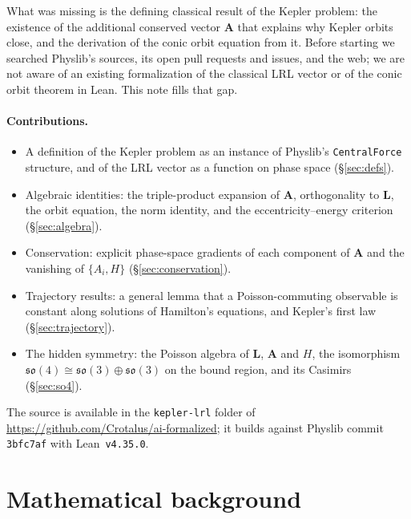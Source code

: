 \documentclass[11pt]{article}
\theoremstyle{definition}
\theoremstyle{remark}
\newcommand{\vA}{\mathbf{A}}
\newcommand{\vL}{\mathbf{L}}
\begin{document}
What was missing is the defining classical result of the Kepler problem: the existence of the
additional conserved vector $\vA$ that explains why Kepler orbits close, and the derivation of
the conic orbit equation from it. Before starting we searched Physlib's sources, its open
pull requests and issues, and the web; we are not aware of an existing formalization of the
classical LRL vector or of the conic orbit theorem in Lean. This note fills that gap.

\paragraph{Contributions.}
\begin{itemize}
  \item A definition of the Kepler problem as an instance of Physlib's \texttt{CentralForce}
  structure, and of the LRL vector as a function on phase space (\S\ref{sec:defs}).
  \item Algebraic identities: the triple-product expansion of $\vA$, orthogonality to $\vL$, the
  orbit equation, the norm identity, and the eccentricity--energy criterion (\S\ref{sec:algebra}).
  \item Conservation: explicit phase-space gradients of each component of $\vA$ and the
  vanishing of $\{A_i,H\}$ (\S\ref{sec:conservation}).
  \item Trajectory results: a general lemma that a Poisson-commuting observable is constant along
  solutions of Hamilton's equations, and Kepler's first law (\S\ref{sec:trajectory}).
  \item The hidden symmetry: the Poisson algebra of $\vL$, $\vA$ and $H$, the isomorphism
  $\mathfrak{so}(4)\cong\mathfrak{so}(3)\oplus\mathfrak{so}(3)$ on the bound region, and its
  Casimirs (\S\ref{sec:so4}).
\end{itemize}

The source is available in the \texttt{kepler-lrl} folder of
\url{https://github.com/Crotalus/ai-formalized}; it builds against
Physlib commit \texttt{3bfc7af} with Lean~\texttt{v4.35.0}.

\section{Mathematical background}\label{sec:background}
\end{document}

